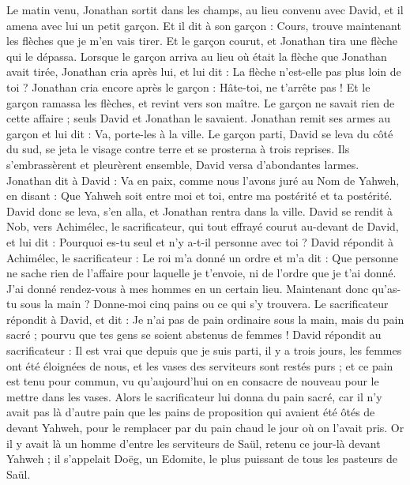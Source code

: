 \begin{multicols}{2}
Le matin venu, Jonathan sortit dans les champs, au lieu convenu avec David, et il amena avec lui un petit garçon.
Et il dit à son garçon : Cours, trouve maintenant les flèches que je m'en vais tirer. Et le garçon courut, et Jonathan tira une flèche qui le dépassa.
Lorsque le garçon arriva au lieu où était la flèche que Jonathan avait tirée, Jonathan cria après lui, et lui dit : La flèche n'est-elle pas plus loin de toi ?
Jonathan cria encore après le garçon : Hâte-toi, ne t'arrête pas ! Et le garçon ramassa les flèches, et revint vers son maître.
Le garçon ne savait rien de cette affaire ; seuls David et Jonathan le savaient.
Jonathan remit ses armes au garçon et lui dit : Va, porte-les à la ville.
Le garçon parti, David se leva du côté du sud, se jeta le visage contre terre et se prosterna à trois reprises. Ils s'embrassèrent et pleurèrent ensemble, David versa d'abondantes larmes.
Jonathan dit à David : Va en paix, comme nous l'avons juré au Nom de Yahweh, en disant : Que Yahweh soit entre moi et toi, entre ma postérité et ta postérité.
David donc se leva, s'en alla, et Jonathan rentra dans la ville.
\VerseOne{}David se rendit à Nob, vers Achimélec, le sacrificateur, qui tout effrayé courut au-devant de David, et lui dit : Pourquoi es-tu seul et n'y a-t-il personne avec toi ?
David répondit à Achimélec, le sacrificateur : Le roi m'a donné un ordre et m'a dit : Que personne ne sache rien de l'affaire pour laquelle je t'envoie, ni de l'ordre que je t'ai donné. J'ai donné rendez-vous à mes hommes en un certain lieu.
Maintenant donc qu'as-tu sous la main ? Donne-moi cinq pains ou ce qui s'y trouvera.
Le sacrificateur répondit à David, et dit : Je n'ai pas de pain ordinaire sous la main, mais du pain sacré ; pourvu que tes gens se soient abstenus de femmes !
David répondit au sacrificateur : Il est vrai que depuis que je suis parti, il y a trois jours, les femmes ont été éloignées de nous, et les vases des serviteurs sont restés purs ; et ce pain est tenu pour commun, vu qu'aujourd'hui on en consacre de nouveau pour le mettre dans les vases.
Alors le sacrificateur lui donna du pain sacré, car il n'y avait pas là d'autre pain que les pains de proposition qui avaient été ôtés de devant Yahweh, pour le remplacer par du pain chaud le jour où on l'avait pris.
Or il y avait là un homme d'entre les serviteurs de Saül, retenu ce jour-là devant Yahweh ; il s'appelait Doëg, un Edomite, le plus puissant de tous les pasteurs de Saül.

\end{multicols}

